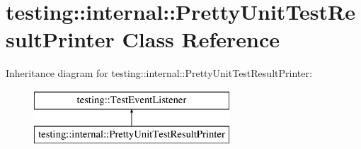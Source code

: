 \hypertarget{classtesting_1_1internal_1_1PrettyUnitTestResultPrinter}{}\section{testing\+:\+:internal\+:\+:Pretty\+Unit\+Test\+Result\+Printer Class Reference}
\label{classtesting_1_1internal_1_1PrettyUnitTestResultPrinter}
Inheritance diagram for testing\+:\+:internal\+:\+:Pretty\+Unit\+Test\+Result\+Printer\+:\begin{figure}[H]
\begin{center}
\leavevmode
\includegraphics[height=2.000000cm]{classtesting_1_1internal_1_1PrettyUnitTestResultPrinter}
\end{center}
\end{figure}
